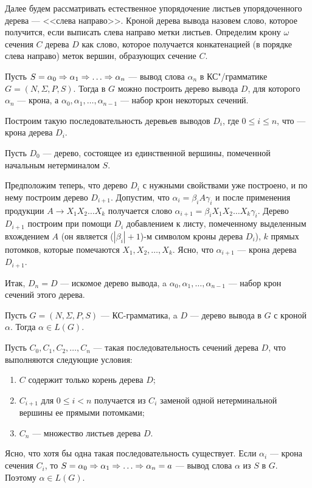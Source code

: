 Далее будем рассматривать естественное упорядочение листьев упорядоченного дерева --- <<слева направо>>. Кроной дерева вывода назовем слово, которое получится, если выписать слева направо метки листьев. Определим крону $\omega$ сечения $C$ дерева $D$ как слово, которое получается конкатенацией (в порядке слева направо) меток вершин, образующих сечение $C$.

\begin{mylemma}
\label{lemma-oSech}
Пусть $S=\alpha_0\Rightarrow\alpha_1\Rightarrow \ldots \Rightarrow \alpha_n$ --- вывод слова $\alpha_n$ в КС"/грамматике $G=(N,\Sigma,P,S)$. Тогда в $G$ можно построить дерево вывода $D$, для которого $\alpha_n$ --- крона, а $\alpha_0,\alpha_1,\ldots ,\alpha_{n-1}$ --- набор крон некоторых сечений.
\end{mylemma}

\begin{myproof}
Построим такую последовательность деревьев выводов $D_i$, где $0\le i\le n$, что --- крона дерева $D_i$.

Пусть $D_0$ --- дерево, состоящее из единственной вершины, помеченной начальным нетерминалом $S$.

Предположим теперь, что дерево $D_i$ с нужными свойствами уже построено, и по нему построим дерево $D_{i+1}$. Допустим, что $\alpha_i=\beta_iA\gamma_i$ и после применения продукции $A\to X_1X_2 \ldots X_k$ получается слово $\alpha_{i+1}=\beta_iX_1X_2 \ldots X_k\gamma_i$. Дерево $D_{i+1}$ построим при помощи $D_i$ добавлением к листу, помеченному выделенным вхождением $A$ (он является ($|\beta_i|+1$)-м символом кроны дерева $D_i$), $k$ прямых потомков, которые помечаются $X_1, X_2, \ldots , X_k$. Ясно, что $\alpha_{i+1}$ --- крона дерева $D_{i+1}$.

Итак, $D_n=D$ --- искомое дерево вывода, a $\alpha_0,\alpha_1, \ldots , \alpha_{n-1}$ --- набор крон сечений этого дерева.
\end{myproof}

\begin{mylemma}
\label{lemma-oKrone}
Пусть $G=(N,\Sigma,P,S)$ --- КС-грамматика, a $D$ --- дерево вывода в $G$ с кроной $\alpha$. Тогда $\alpha\in L(G)$.
\end{mylemma}

\begin{myproof}
Пусть $C_0,C_1,C_2, \ldots , C_n$ --- такая последовательность сечений дерева $D$, что выполняются следующие условия:

\begin{enumerate}
\item $C$ содержит только корень дерева $D$;

\item $C_{i+1}$ для $0\le i<n$ получается из $C_i$ заменой одной нетерминальной вершины ее прямыми потомками;

\item $C_n$ --- множество листьев дерева $D$.
\end{enumerate}

Ясно, что хотя бы одна такая последовательность существует. Если $\alpha_i$ --- крона сечения $C_i$, то $S=\alpha_0\Rightarrow \alpha_1\Rightarrow \ldots \Rightarrow \alpha_n=a$ --- вывод слова $\alpha$ из $S$ в $G$. Поэтому $\alpha\in L(G)$.
\end{myproof}


